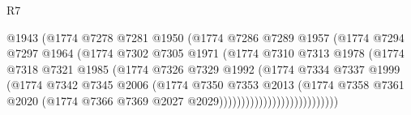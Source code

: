 \begin{lexlean}{R7}
\begin{coremodule}
                                  @1943
                                  (@1774
                                    @7278
                                    @7281
                                    @1950
                                    (@1774
                                      @7286
                                      @7289
                                      @1957
                                      (@1774
                                        @7294
                                        @7297
                                        @1964
                                        (@1774
                                          @7302
                                          @7305
                                          @1971
                                          (@1774
                                            @7310
                                            @7313
                                            @1978
                                            (@1774
                                              @7318
                                              @7321
                                              @1985
                                              (@1774
                                                @7326
                                                @7329
                                                @1992
                                                (@1774
                                                  @7334
                                                  @7337
                                                  @1999
                                                  (@1774
                                                    @7342
                                                    @7345
                                                    @2006
                                                    (@1774
                                                      @7350
                                                      @7353
                                                      @2013
                                                      (@1774
                                                        @7358
                                                        @7361
                                                        @2020
                                                        (@1774
                                                          @7366
                                                          @7369
                                                          @2027
                                                          @2029)))))))))))))))))))))))))))

\end{coremodule}
\end{lexlean}
